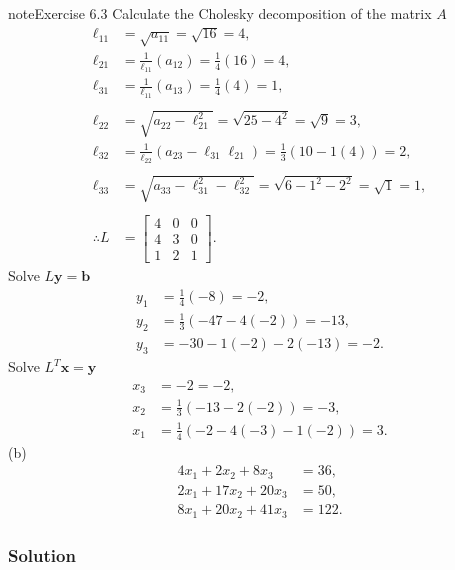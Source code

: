 \documentclass[letterpaper,10pt,english]{jupyterBook}
\begin{document}
\begin{sphinxadmonition}{note}{Exercise 6.3}
\sphinxAtStartPar
Calculate the Cholesky decomposition of the matrix \(A\)
\begin{align*}
    \ell_{11} &= \sqrt{ a_{11} } = \sqrt{ 16 } = 4, \\
    \ell_{21} &= \frac{1}{\ell_{11}} \left( a_{12} \right) = \frac{1}{4} \left( 16 \right) = 4, \\
    \ell_{31} &= \frac{1}{\ell_{11}} \left( a_{13} \right) = \frac{1}{4} \left( 4 \right) = 1, \\
    \\
    \ell_{22} &= \sqrt{ a_{22} - \ell_{21}^2 } = \sqrt{ 25 - 4^2 } = \sqrt{ 9 } = 3, \\
    \ell_{32} &= \frac{1}{\ell_{22}} \left( a_{23} - \ell_{31} \ell_{21} \right) = \frac{1}{3} \left( 10 - 1 \left( 4 \right) \right) = 2, \\
    \\
    \ell_{33} &= \sqrt{ a_{33} - \ell_{31}^2 - \ell_{32}^2 } = \sqrt{ 6 - 1^2 - 2^2 } = \sqrt{ 1 } = 1, \\
    \\
    \therefore L &= \left[\begin{matrix}4 & 0 & 0\\4 & 3 & 0\\1 & 2 & 1\end{matrix}\right].
\end{align*}
\sphinxAtStartPar
Solve \(L \mathbf{y} = \mathbf{b}\)
\begin{align*}
    y_{1} &= \frac{1}{4} \left( -8\right) = -2, \\
    y_{2} &= \frac{1}{3} \left( -47 - 4 \left( -2 \right)\right) = -13, \\
    y_{3} &= -30 - 1 \left( -2 \right) - 2 \left( -13 \right) = -2.
\end{align*}
\sphinxAtStartPar
Solve \(L^T \mathbf{x} = \mathbf{y}\)
\begin{align*}
    x_{3} &= -2 = -2, \\
    x_{2} &= \frac{1}{3} \left(-13 - 2 \left( -2 \right) \right) = -3, \\
    x_{1} &= \frac{1}{4} \left(-2 - 4 \left( -3 \right) - 1 \left( -2 \right) \right) = 3.
\end{align*}
\sphinxAtStartPar
(b)
\begin{align*}
    4x_1 +2x_2 +8x_3 &=36,\\
    2x_1 +17x_2 +20x_3 &=50,\\
    8x_1 +20x_2 +41x_3 &=122.
\end{align*}\subsubsection*{Solution}


\end{sphinxadmonition}
\end{document}
